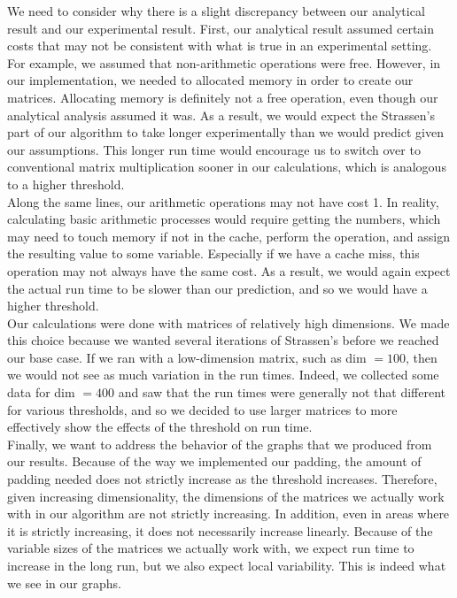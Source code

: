 \documentclass[12pt]{article}
\begin{document}
We need to consider why there is a slight discrepancy between our analytical result and our experimental result. First, our analytical result assumed certain costs that may not be consistent with what is true in an experimental setting. For example, we assumed that non-arithmetic operations were free. However, in our implementation, we needed to allocated memory in order to create our matrices. Allocating memory is definitely not a free operation, even though our analytical analysis assumed it was. As a result, we would expect the Strassen's part of our algorithm to take longer experimentally than we would predict given our assumptions. This longer run time would encourage us to switch over to conventional matrix multiplication sooner in our calculations, which is analogous to a higher threshold. \\

Along the same lines, our arithmetic operations may not have cost 1. In reality, calculating basic arithmetic processes would require getting the numbers, which may need to touch memory if not in the cache, perform the operation, and assign the resulting value to some variable. Especially if we have a cache miss, this operation may not always have the same cost. As a result, we would again expect the actual run time to be slower than our prediction, and so we would have a higher threshold. \\

Our calculations were done with matrices of relatively high dimensions. We made this choice because we wanted several iterations of Strassen's before we reached our base case. If we ran with a low-dimension matrix, such as dim $= 100$, then we would not see as much variation in the run times. Indeed, we collected some data for dim $= 400$ and saw that the run times were generally not that different for various thresholds, and so we decided to use larger matrices to more effectively show the effects of the threshold on run time. \\

Finally, we want to address the behavior of the graphs that we produced from our results. Because of the way we implemented our padding, the amount of padding needed does not strictly increase as the threshold increases. Therefore, given increasing dimensionality, the dimensions of the matrices we actually work with in our algorithm are not strictly increasing. In addition, even in areas where it is strictly increasing, it does not necessarily increase linearly. Because of the variable sizes of the matrices we actually work with, we expect run time to increase in the long run, but we also expect local variability. This is indeed what we see in our graphs.
\end{document}
